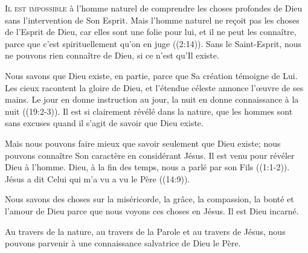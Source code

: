 \dvrule






\lettrine{I}{l est impossible} à l'homme naturel de comprendre
 les choses profondes de Dieu sans l'intervention de Son Esprit.
 \Og Mais l'homme naturel ne re\c{c}oit pas les choses de l'Esprit de Dieu,
 car elles sont une folie pour lui, et il ne peut les connaître,
 parce que c'est spirituellement qu'on en juge \Fg{}
 ((2:14)).
 Sans le Saint-Esprit, nous ne pouvons rien connaître de Dieu,
 si ce n'est qu'Il existe.

Nous savons que Dieu existe, en partie, parce que Sa création
 témoigne de Lui. \Og Les cieux racontent la gloire de Dieu,
 et l'étendue céleste annonce l'\oe{}uvre de ses mains.
 Le jour en donne instruction au jour, la nuit en donne connaissance
 à la nuit \Fg{} ((19:2-3)).
 Il est si clairement révélé dans la nature, que les hommes sont
 sans excuses quand il s'agit de savoir que Dieu existe.

Mais nous pouvons faire mieux que savoir seulement que Dieu existe;
 nous pouvons connaître Son caractère en considérant Jésus.
 Il est venu pour révéler Dieu à l'homme.
 \Og Dieu, à la fin des temps, nous a parlé par son Fils \Fg{}
 ((1:1-2)).
 Jésus a dit\frcolon{} 
 \Og Celui qui m'a vu a vu le Père \Fg{} ((14:9)).

Nous savons des choses sur la miséricorde, la grâce, la compassion,
 la bonté et l'amour de Dieu parce que nous voyons ces choses en Jésus.
 Il est Dieu incarné.

Au travers de la nature, au travers de la Parole et au travers de Jésus,
 nous pouvons parvenir à une connaissance salvatrice de Dieu le Père.


